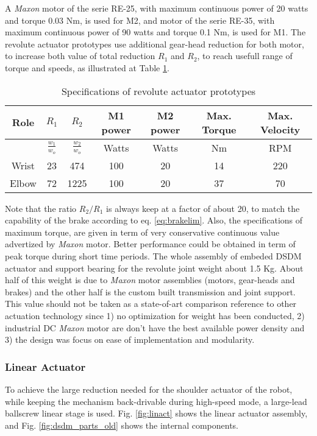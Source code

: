 A \textit{Maxon} motor of the serie RE-25, with maximum continuous power of 20 watts and torque 0.03 Nm, is used for M2, and motor of the serie RE-35, with maximum continuous power of 90 watts and torque 0.1 Nm, is used for M1. The revolute actuator prototypes use additional gear-head reduction for both motor, to increase both value of total reduction $R_1$ and $R_2$, to reach usefull range of torque and speeds, as illustrated at Table \ref{tab:specrev}. 
%
\begin{table}[htbp]
	\centering
	\caption{Specifications of revolute actuator prototypes}
		\begin{tabular}{ c c c c c c c}
			\hline
			Role & $R_1$ & $R_2$ & M1 power & M2 power & Max. Torque & Max. Velocity \\
			\hline
			       & $\frac{w_1}{w_o}$ & $\frac{w_2}{w_o}$ & Watts & Watts & Nm & RPM \\
			\hline \hline
			Wrist & 23 & 474  & 100 & 20 & 14 & 220 \\
			Elbow & 72 & 1225 & 100 & 20 & 37 & 70 \\
			\hline
		\end{tabular}
	\label{tab:specrev}
\end{table}
 
Note that the ratio $R_2/R_1$ is always keep at a factor of about 20, to match the capability of the brake according to eq. \eqref{eq:brakelim}. Also, the specifications of maximum torque, are given in term of very conservative continuous value advertized by \textit{Maxon} motor. Better performance could be obtained in term of peak torque during short time periods. The whole assembly of embeded DSDM actuator and support bearing for the revolute joint weight about 1.5 Kg. About half of this weight is due to \textit{Maxon} motor assemblies (motors, gear-heads and brakes) and the other half is the custom built transmission and joint support. This value should not be taken as a state-of-art comparison reference to other actuation technology since 1) no optimization for weight has been conducted, 2) industrial DC \textit{Maxon} motor are don't have the best available power density and 3) the design was focus on ease of implementation and modularity. 


\subsubsection{Linear Actuator}

To achieve the large reduction needed for the shoulder actuator of the robot, while keeping the mechanism back-drivable during high-speed mode, a large-lead ballscrew linear stage is used. Fig. \ref{fig:linact} shows the linear actuator assembly, and Fig. \ref{fig:dsdm_parts_old} shows the internal components. 


